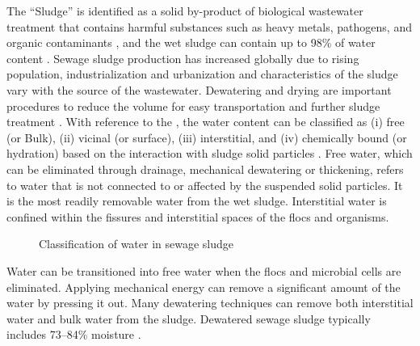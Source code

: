The “Sludge” is identified as a solid by-product of biological wastewater treatment that contains harmful substances such as heavy metals, pathogens, and organic contaminants \cite{Wu2020}, and the wet sludge can contain up to 98\% of water content  \cite{Chan2016} \cite{SyedHassan2017}. Sewage sludge production has increased globally due to rising population, industrialization and urbanization and characteristics of the sludge vary with the source of the wastewater. Dewatering and drying are important procedures to reduce the volume for easy transportation and further sludge treatment \cite{Chang2023}. With reference to the , the water content can be classified as (i) free (or Bulk), (ii) vicinal (or surface), (iii) interstitial, and (iv) chemically bound (or hydration) based on the interaction with sludge solid particles \cite{SyedHassan2017} \cite{Qi2020} \cite{Vaxelaire2004} \cite{Novak2006}. Free water, which can be eliminated through drainage, mechanical dewatering or thickening, refers to water that is not connected to or affected by the suspended solid particles. It is the most readily removable water from the wet sludge. Interstitial water is confined within the fissures and interstitial spaces of the flocs and organisms.

\begin{figure}[H]
\centering
{}
\caption{Classification of water in sewage sludge}\cite{Qi2020}
\label{fig:Sludge_water}
\end{figure}

 Water can be transitioned into free water when the flocs and microbial cells are eliminated. Applying mechanical energy can remove a significant amount of the water by pressing it out. Many dewatering techniques can remove both interstitial water and bulk water from the sludge. Dewatered sewage sludge typically includes 73–84\% moisture \cite{Chan2016}.
 
